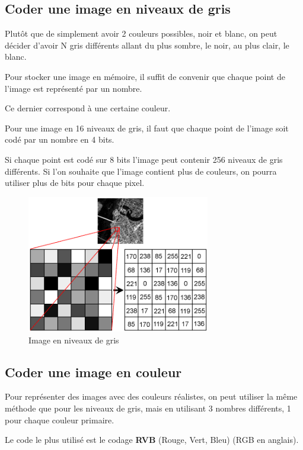 \documentclass[11pt, a4paper]{book}
\begin{document}
\subsection{Coder une image en niveaux de gris}

Plutôt que de simplement avoir 2 couleurs possibles, noir et blanc, on peut décider d'avoir N gris différents allant du plus sombre, le noir, au plus clair, le blanc.

Pour stocker une image en mémoire, il suffit de convenir que chaque point de l’image est représenté par un nombre. 

Ce dernier correspond à une certaine couleur.

Pour une image en 16 niveaux de gris, il faut que chaque point de l’image soit codé par un nombre en 4 bits.

Si chaque point est codé sur 8 bits l’image peut contenir 256 niveaux de gris différents. Si l'on souhaite que l'image contient plus de couleurs, on pourra utiliser plus de bits pour chaque pixel.


\begin{center}
\begin{figure}[H]
\centering
\includegraphics[width=8cm]{images/grayscale}
\caption{Image en niveaux de gris}
\end{figure}
\end{center}


\subsection{Coder une image en couleur}

Pour représenter des images avec des couleurs réalistes, on peut utiliser la même méthode que pour les niveaux de gris, mais en utilisant 3 nombres différents, 1 pour chaque couleur primaire.

Le code le plus utilisé est le codage {\bf RVB} (Rouge, Vert, Bleu) (RGB en anglais). 
\end{document}
